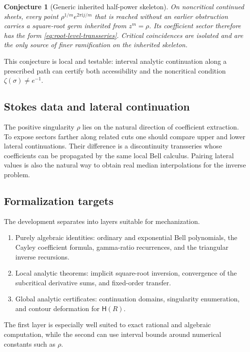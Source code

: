 \documentclass[11pt,oneside]{article}
\numberwithin{equation}{section}
\theoremstyle{plain}
\newtheorem{conjecture}[theorem]{Conjecture}
\theoremstyle{definition}
\theoremstyle{remark}
\newcommand{\ii}{\mathrm i}
\begin{document}
\begin{conjecture}[Generic inherited half-power skeleton]
On noncritical continued sheets, every point
$\rho^{1/m}e^{2\pi\ii j/m}$ that is reached without an earlier obstruction
carries a square-root germ inherited from $z^m=\rho$.  Its coefficient
sector therefore has the form \eqref{eq:root-level-transseries}.  Critical
coincidences are isolated and are the only source of finer ramification on
the inherited skeleton.
\end{conjecture}

This conjecture is local and testable: interval analytic continuation along
a prescribed path can certify both accessibility and the noncritical
condition $\zeta(\sigma)\ne e^{-1}$.

\subsection{Stokes data and lateral continuation}

The positive singularity $\rho$ lies on the natural direction of coefficient
extraction.  To expose sectors farther along related cuts one should compare
upper and lower lateral continuations.  Their difference is a discontinuity
transseries whose coefficients can be propagated by the same local Bell
calculus.  Pairing lateral values is also the natural way to obtain real
median interpolations for the inverse problem.

\subsection{Formalization targets}

The development separates into layers suitable for mechanization.
\begin{enumerate}
\item Purely algebraic identities: ordinary and exponential Bell
      polynomials, the Cayley coefficient formula, gamma-ratio recurrences,
      and the triangular inverse recursions.
\item Local analytic theorems: implicit square-root inversion, convergence
      of the subcritical derivative sums, and fixed-order transfer.
\item Global analytic certificates: continuation domains, singularity
      enumeration, and contour deformation for $\mathsf H(R)$.
\end{enumerate}
The first layer is especially well suited to exact rational and algebraic
computation, while the second can use interval bounds around numerical
constants such as $\rho$.
\end{document}
